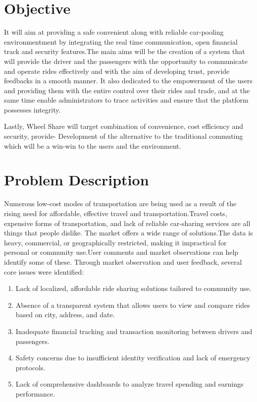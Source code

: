 \section{Objective}

It will aim at providing a safe convenient along with reliable car-pooling environmentment by integrating the real time communication, open financial track and security features.The main aims will be the creation of a system that will provide the driver and the passengers with the opportunity to communicate and operate rides effectively and with the aim of developing trust, provide feedbacks in a smooth manner\cite{ashkrof2022}. It also dedicated to the empowerment of the users and providing them with the entire control over their rides and trade, and at the same time enable administrators to trace activities and ensure that the platform possesses integrity.

Lastly, Wheel Share will target combination of convenience, cost efficiency and security, provide-
Development of the alternative to the traditional commuting which will be a win-win to the users and the environment.


\section{Problem Description}

Numerous low-cost modes of transportation are being used as a result of the rising need for affordable, effective travel and transportation.Travel costs, expensive forms of transportation, and lack of reliable car-sharing services are all things that people dislike. The market offers a wide range of solutions.The data is heavy, commercial, or geographically restricted, making it impractical for personal or community use.User comments and market observations can help identify some of these.
Through market observation and user feedback, several core issues were identified:


\begin{enumerate}[label=\roman*.]
    \item Lack of localized, affordable ride sharing solutions tailored to community use.
    \item Absence of a transparent system that allows users to view and compare rides based on city, address, and date.
    \item Inadequate financial tracking and transaction monitoring between drivers and passengers.
    \item Safety concerns due to insufficient identity verification and lack of emergency protocols.
    \item Lack of comprehensive dashboards to analyze travel spending and earnings performance.
    

\end{enumerate}


